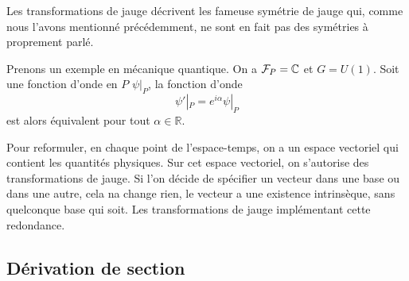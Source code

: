 \documentclass[a4paper,11pt]{report}
\begin{document}
                Les transformations de jauge décrivent les fameuse symétrie de jauge qui, comme nous l'avons mentionné précédemment, ne sont en fait pas des symétries à proprement parlé.
                
                \begin{exmp}
                    Prenons un exemple en mécanique quantique. On a $\mathcal{F}_P = \mathbb{C}$ et $G = U(1)$. Soit une fonction d'onde en $P$ $\psi|_P$, la fonction d'onde
                    \begin{equation}
                        \psi'|_P = e^{i\alpha}\psi|_P
                    \end{equation}
                    est alors équivalent pour tout $\alpha\in\mathbb{R}$.
                \end{exmp}
                
                Pour reformuler, en chaque point de l'espace-temps, on a un espace vectoriel qui contient les quantités physiques. Sur cet espace vectoriel, on s'autorise des transformations de jauge. Si l'on décide de spécifier un vecteur dans une base ou dans une autre, cela na change rien, le vecteur a une existence intrinsèque, sans quelconque base qui soit. Les transformations de jauge implémentant cette redondance.
            
            \subsection{Dérivation de section}
            
\end{document}
